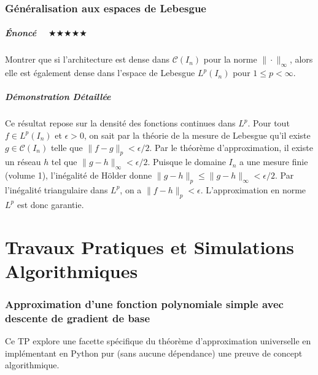 \documentclass[11pt,a4paper]{article}
\begin{document}
\section{Généralisation aux espaces de Lebesgue}

\subsubsection{Énoncé $\quad \bigstar\bigstar\bigstar\bigstar\bigstar$}

Montrer que si l'architecture est dense dans $\mathcal{C}(I_n)$ pour la norme $\|\cdot\|_\infty$, alors elle est également dense dans l'espace de Lebesgue $L^p(I_n)$ pour $1 \le p < \infty$.

\subsubsection{Démonstration Détaillée}

Ce résultat repose sur la densité des fonctions continues dans $L^p$. Pour tout $f \in L^p(I_n)$ et $\epsilon > 0$, on sait par la théorie de la mesure de Lebesgue qu'il existe $g \in \mathcal{C}(I_n)$ telle que $\|f - g\|_p < \epsilon/2$. Par le théorème d'approximation, il existe un réseau $h$ tel que $\|g - h\|_\infty < \epsilon/2$. Puisque le domaine $I_n$ a une mesure finie (volume 1), l'inégalité de Hölder donne $\|g - h\|_p \le \|g - h\|_\infty < \epsilon/2$. Par l'inégalité triangulaire dans $L^p$, on a $\|f - h\|_p < \epsilon$. L'approximation en norme $L^p$ est donc garantie.


\newpage
\part{Travaux Pratiques et Simulations Algorithmiques}
\section{Approximation d'une fonction polynomiale simple avec descente de gradient de base}

Ce TP explore une facette spécifique du théorème d'approximation universelle en implémentant en Python pur (sans aucune dépendance) une preuve de concept algorithmique.
\end{document}

